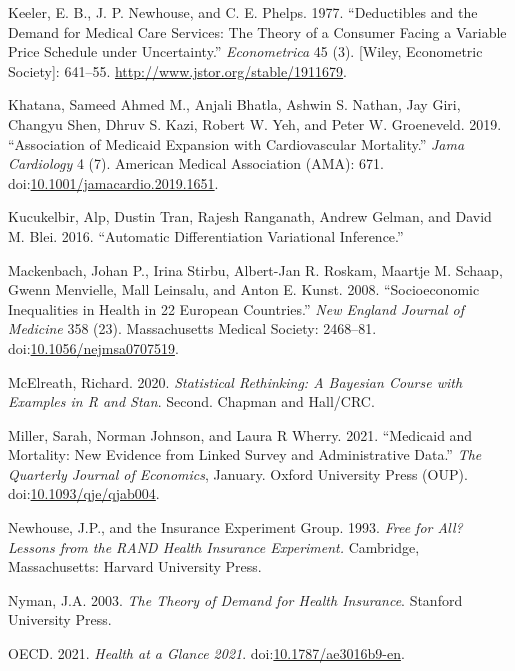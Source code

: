 \documentclass[a4paper,12pt]{article}
\begin{document}
\hypertarget{citeproc_bib_item_14}{Keeler, E. B., J. P. Newhouse, and C. E. Phelps. 1977. “Deductibles and the Demand for Medical Care Services: The Theory of a Consumer Facing a Variable Price Schedule under Uncertainty.” \textit{Econometrica} 45 (3). [Wiley, Econometric Society]: 641–55. \url{http://www.jstor.org/stable/1911679}.}

\hypertarget{citeproc_bib_item_15}{Khatana, Sameed Ahmed M., Anjali Bhatla, Ashwin S. Nathan, Jay Giri, Changyu Shen, Dhruv S. Kazi, Robert W. Yeh, and Peter W. Groeneveld. 2019. “Association of Medicaid Expansion with Cardiovascular Mortality.” \textit{Jama Cardiology} 4 (7). American Medical Association (AMA): 671. doi:\href{https://doi.org/10.1001/jamacardio.2019.1651}{10.1001/jamacardio.2019.1651}.}

\hypertarget{citeproc_bib_item_16}{Kucukelbir, Alp, Dustin Tran, Rajesh Ranganath, Andrew Gelman, and David M. Blei. 2016. “Automatic Differentiation Variational Inference.”}

\hypertarget{citeproc_bib_item_17}{Mackenbach, Johan P., Irina Stirbu, Albert-Jan R. Roskam, Maartje M. Schaap, Gwenn Menvielle, Mall Leinsalu, and Anton E. Kunst. 2008. “Socioeconomic Inequalities in Health in 22 European Countries.” \textit{New England Journal of Medicine} 358 (23). Massachusetts Medical Society: 2468–81. doi:\href{https://doi.org/10.1056/nejmsa0707519}{10.1056/nejmsa0707519}.}

\hypertarget{citeproc_bib_item_18}{McElreath, Richard. 2020. \textit{Statistical Rethinking: A Bayesian Course with Examples in R and Stan}. Second. Chapman and Hall/CRC.}

\hypertarget{citeproc_bib_item_19}{Miller, Sarah, Norman Johnson, and Laura R Wherry. 2021. “Medicaid and Mortality: New Evidence from Linked Survey and Administrative Data.” \textit{The Quarterly Journal of Economics}, January. Oxford University Press (OUP). doi:\href{https://doi.org/10.1093/qje/qjab004}{10.1093/qje/qjab004}.}

\hypertarget{citeproc_bib_item_20}{Newhouse, J.P., and the Insurance Experiment Group. 1993. \textit{Free for All? Lessons from the RAND Health Insurance Experiment.} Cambridge, Massachusetts: Harvard University Press.}

\hypertarget{citeproc_bib_item_21}{Nyman, J.A. 2003. \textit{The Theory of Demand for Health Insurance}. Stanford University Press.}

\hypertarget{citeproc_bib_item_22}{OECD. 2021. \textit{Health at a Glance 2021}. doi:\href{https://doi.org/10.1787/ae3016b9-en}{10.1787/ae3016b9-en}.}
\end{document}
